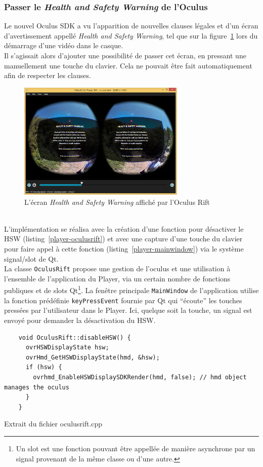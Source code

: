 \subsubsection{Passer le \textit{Health and Safety Warning} de l'Oculus}
Le nouvel Oculus SDK a vu l'apparition de nouvelles clauses légales et d'un écran
d'avertissement appellé \textit{Health and Safety Warning}, tel que sur la figure~\ref{hsw-oculus}
lors du démarrage d'une vidéo dans le casque\cite{oculus-developer-guide}.\\
Il s'agissait alors d'ajouter une possibilité de passer cet écran, en pressant une
manuellement une touche du clavier. Cela ne pouvait être fait automatiquement afin de respecter les clauses.
\begin{figure}
  \centering
  \includegraphics[width=8cm]{images/player-oculus-hsw.jpg}
  \caption{L'écran \textit{Health and Safety Warning} affiché par l'Oculus Rift}
  \label{hsw-oculus}
\end{figure}
\ \\
L'implémentation se réalisa avec la création d'une fonction pour désactiver le HSW
(listing~\ref{player-oculusrift}) et avec une capture d'une touche du clavier pour faire appel à 
cette fonction (listing~\ref{player-mainwindow}) via le système signal/slot de Qt.\\
La classe \texttt{OculusRift} propose une gestion de l'oculus et une utilisation
à l'ensemble de l'application du Player, via un certain nombre de fonctions publiques
et de slots Qt\footnote{Un slot est une fonction pouvant être appellée de manière asynchrone 
par un signal provenant de la même classe ou d'une autre.}. La fenêtre principale \texttt{MainWindow}
de l'application utilise la fonction prédéfinie \texttt{keyPressEvent} fournie
par Qt qui \enquote{écoute} les touches pressées par l'utilisateur dans le Player.
Ici, quelque soit la touche, un signal est envoyé pour demander la désactivation du HSW.
\begin{listing}
  \begin{verbatim}
    void OculusRift::disableHSW() {
      ovrHSWDisplayState hsw;
      ovrHmd_GetHSWDisplayState(hmd, &hsw);
      if (hsw) {
        ovrhmd_EnableHSWDisplaySDKRender(hmd, false); // hmd object manages the oculus
      }
    }
  \end{verbatim}
  \caption{Extrait du fichier oculusrift.cpp}
  \label{player-oculusrift}
\end{listing}

